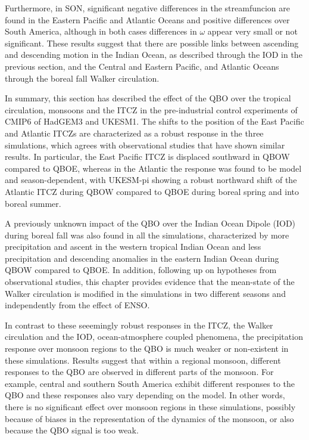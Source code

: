 Furthermore, in SON, significant negative differences in the streamfuncion are found in the Eastern Pacific and Atlantic Oceans and positive differences over South America, although in both cases differences in $\omega$ appear very small or not significant. 
These results suggest that there are possible links between ascending and descending motion in the Indian Ocean, as described through the IOD in the previous section, and the Central and Eastern Pacific, and Atlantic Oceans through the boreal fall Walker circulation.

In summary, this section has described the effect of the QBO over the tropical circulation, monsoons and the ITCZ in the pre-industrial control experiments of CMIP6 of HadGEM3 and UKESM1. 
The shifts to the position of the East Pacific and Atlantic ITCZs are characterized as a robust response in the three simulations, which agrees with observational studies \citep{gray2018} that have shown similar results. 
In particular, the East Pacific ITCZ is displaced southward in QBOW compared to QBOE, whereas in the Atlantic the response was found to be model and season-dependent, with UKESM-pi showing a robust northward shift of the Atlantic ITCZ during QBOW compared to QBOE during boreal spring and into boreal summer.

A previously unknown impact of the QBO over the Indian Ocean Dipole (IOD) during boreal fall was also found in all the simulations, characterized by more precipitation and ascent in the western tropical Indian Ocean and less precipitation and descending anomalies in the eastern Indian Ocean during QBOW compared to QBOE. 
In addition, following up on hypotheses from observational studies, this chapter provides evidence that the mean-state of the Walker circulation is modified in the simulations in two different seasons and independently from the effect of ENSO. 

In contrast to these seeemingly robust responses in the ITCZ, the Walker circulation and  the IOD,  ocean-atmosphere coupled phenomena, the precipitation response over monsoon regions to the QBO is much weaker or non-existent in these simulations. Results suggest that within a regional monsoon, different responses to the QBO are observed in different parts of the monsoon. For example, central and southern South America exhibit different responses to the QBO and these responses also vary depending on the model. 
In other words, there is no significant effect over monsoon regions in these simulations, possibly because of biases in the representation of the dynamics of the monsoon, or also because the QBO signal is too weak. 


